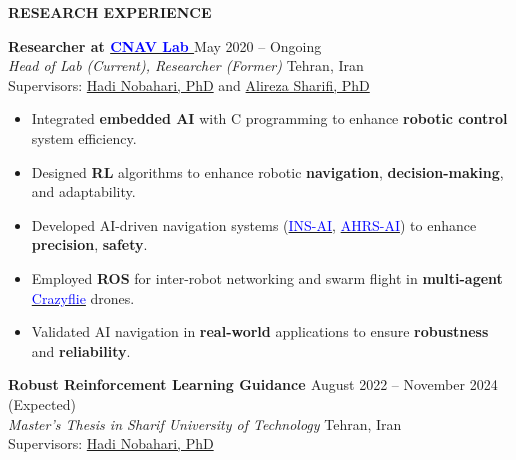 \documentclass[12pt]{article}
\begin{document}
\vspace{0.2in} %


\newpage
\begin{center}
	{\noindent \bfseries RESEARCH EXPERIENCE} %
\end{center} 

\vspace{8pt} %

\noindent
{\bfseries Researcher at
\href{https://www.linkedin.com/company/cnav-lab/}{\textcolor{blue}{CNAV Lab \faLinkedin}} \href{https://github.com/CNAVLAB}{\faGithub}
\textcolor{red}{
\href{https://youtube.com/@cnavlab?si=Fc-Y3oyKdgAmz3-5}{\faYoutube}}
} \hfill May 2020 -- Ongoing \\ 
\noindent \textit{Head of Lab (Current), Researcher (Former) }
\hfill Tehran, Iran \\ 
\noindent Supervisors: 
\href{https://ae.sharif.edu/~portal/faculty/1091235256}{Hadi Nobahari, PhD} and
\href{https://ae.sharif.edu/~portal/faculty/1730782165}{Alireza Sharifi, PhD}

\begin{itemize} %
    \item Integrated \textbf{embedded AI} with C programming to enhance \textbf{robotic control} system efficiency.
	\item Designed \textbf{RL} algorithms to enhance robotic \textbf{navigation}, \textbf{decision-making}, and adaptability.
    \item Developed AI-driven navigation systems (\href{https://github.com/alibaniasad1999/AHRS_AI}{\textcolor{blue}{INS-AI}}, \href{https://github.com/alibaniasad1999/GPS_INS}{\textcolor{blue}{AHRS-AI}}) to enhance \textbf{precision}, \textbf{safety}.
    \item Employed \textbf{ROS} for inter-robot networking and swarm flight in \textbf{multi-agent} \href{https://www.bitcraze.io/products/old-products/crazyflie-2-0/}{\textcolor{blue}{Crazyflie}} drones.
    \item Validated AI navigation in \textbf{real-world} applications to ensure \textbf{robustness} and \textbf{reliability}.
\end{itemize}

\vspace{0.2in}
\noindent
{\bfseries  Robust Reinforcement Learning Guidance
\href{https://github.com/CNAVLAB}{\faGithub}
} \hfill August 2022 -- November 2024 (Expected) \\ 
\noindent \textit{Master's Thesis in Sharif University of Technology} \hfill Tehran, Iran \\ 
\noindent Supervisors: 
\href{https://ae.sharif.edu/~portal/faculty/1091235256}{Hadi Nobahari, PhD}
\end{document}
